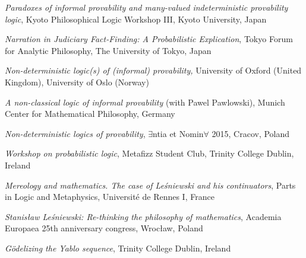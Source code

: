 \documentclass[10pt, a4paper]{article}
\newcommand{\years}[1]{\marginnote{\normalsize #1}}
\begin{document}
\vspace{0.5mm}

\emph{Paradoxes of informal provability and many-valued indeterministic provability logic}, Kyoto Philosophical Logic Workshop III, Kyoto University, Japan

\vspace{0.5mm}


\emph{Narration in Judiciary Fact-Finding: A Probabilistic Explication}, Tokyo Forum for Analytic Philosophy, The University of Tokyo, Japan


\vspace{0.5mm}


\years{2015}  \emph{Non-deterministic logic(s) of (informal) provability,}  University of Oxford (United Kingdom), University of Oslo (Norway)


\vspace{0.5mm}


 \emph{A non-classical logic of informal provability} (with Pawel Pawlowski), Munich Center for Mathematical Philosophy, Germany


\vspace{0.5mm}


\emph{Non-deterministic logics of provability}, $\exists$ntia et Nomin$\forall$ 2015, Cracov, Poland


\vspace{0.5mm}


  \emph{Workshop on  probabilistic logic}, Metafizz Student Club,
Trinity College Dublin, Ireland


\vspace{0.5mm}



\years{2013} \emph{Mereology and mathematics. The case of Le\'sniewski and his continuators}, Parts in Logic and Metaphysics, Universit{\'e} de Rennes I, France


\vspace{0.5mm}


\emph{Stanis\l aw Le\' sniewski: Re-thinking the philosophy of mathematics}, Academia Europaea 25th anniversary congress, Wroc\l aw, Poland


\vspace{0.5mm}




\years{2012} \emph{G{\"o}delizing the Yablo sequence},  Trinity College Dublin, Ireland


\vspace{0.5mm}
\end{document}
